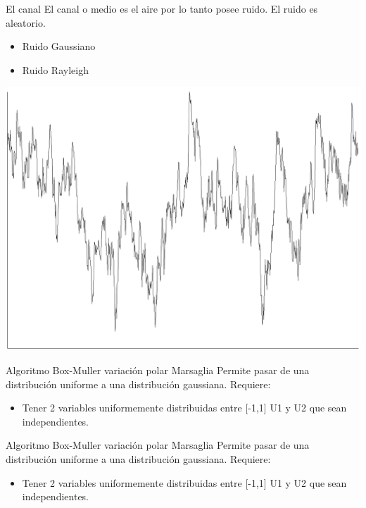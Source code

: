 \documentclass[pdf]{beamer}
\begin{document}
\begin{frame}{El canal}
El canal o medio es el aire por lo tanto posee ruido.
El ruido es aleatorio. 
\begin{itemize}
\item Ruido Gaussiano
\item Ruido Rayleigh
\end{itemize}
\begin{center}
\includegraphics[height=0.4\textheight]{noise.png}
\end{center}
\end{frame}
\begin{frame}{Algoritmo Box-Muller variación polar Marsaglia}
Permite pasar de una distribución uniforme a una distribución gaussiana.
Requiere:
\begin{itemize}
\item Tener 2 variables uniformemente distribuidas entre [-1,1] U1 y U2 que sean independientes.
\end{itemize}
\end{frame}
\begin{frame}{Algoritmo Box-Muller variación polar Marsaglia}
Permite pasar de una distribución uniforme a una distribución gaussiana.
Requiere:
\begin{itemize}
\item Tener 2 variables uniformemente distribuidas entre [-1,1] U1 y U2 que sean independientes.
\end{itemize}
\end{frame}
\end{document}

